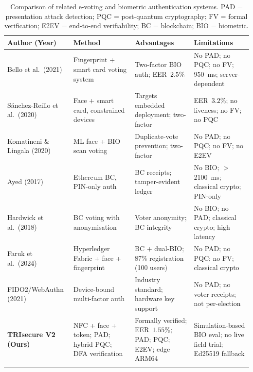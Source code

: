 \documentclass[pdflatex,sn-mathphys-num]{sn-jnl}%
\theoremstyle{thmstyleone}%
\theoremstyle{thmstyletwo}%
\theoremstyle{thmstylethree}%
\begin{document}
\begin{table}[t]
\caption{Comparison of related e-voting and biometric authentication systems.
  PAD = presentation attack detection; PQC = post-quantum cryptography;
  FV = formal verification; E2EV = end-to-end verifiability;
  BC = blockchain; BIO = biometric.}
\label{tab:related_comparison}%
\begin{tabular*}{\textwidth}{@{\extracolsep\fill}p{2.1cm}p{2.7cm}p{3.0cm}p{3.0cm}}
  \toprule
  \textbf{Author (Year)} & \textbf{Method} & \textbf{Advantages} & \textbf{Limitations} \\
  \midrule
  Bello et al.\ (2021)~\cite{bello2021biometric}
    & Fingerprint + smart card voting system
    & Two-factor BIO auth; EER~$2.5\%$
    & No PAD; no PQC; no FV; 950~ms; server-dependent \\
  \addlinespace
  S\'{a}nchez-Reillo et al.\ (2020)~\cite{sanchez2020biometric}
    & Face + smart card, constrained devices
    & Targets embedded deployment; two-factor
    & EER~$3.2\%$; no liveness; no FV; no PQC \\
  \addlinespace
  Komatineni \& Lingala (2020)~\cite{komatineni2020biometric}
    & ML face + BIO scan voting
    & Duplicate-vote prevention; two-factor
    & No PAD; no PQC; no FV; no E2EV \\
  \addlinespace
  Ayed (2017)~\cite{ayed2017conceptual}
    & Ethereum BC, PIN-only auth
    & BC receipts; tamper-evident ledger
    & No BIO; $>$2100~ms; classical crypto; PIN-only \\
  \addlinespace
  Hardwick et al.\ (2018)~\cite{hardwick2018voting}
    & BC voting with anonymisation
    & Voter anonymity; BC integrity
    & No BIO; no PAD; classical crypto; high latency \\
  \addlinespace
  Faruk et al.\ (2024)~\cite{faruk2024transforming}
    & Hyperledger Fabric + face + fingerprint
    & BC + dual-BIO; 87\% registration (100 users)
    & No PAD; no PQC; no FV; classical crypto \\
  \addlinespace
  FIDO2/WebAuthn (2021)~\cite{fido2_webauthn}
    & Device-bound multi-factor auth
    & Industry standard; hardware key support
    & No PAD; no voter receipts; not per-election \\
  \addlinespace
  \textbf{TRIsecure V2 (Ours)}
    & NFC + face + token; PAD; hybrid PQC; DFA verification
    & Formally verified; EER~$1.55\%$; PAD; PQC; E2EV; edge ARM64
    & Simulation-based BIO eval; no live field trial; Ed25519 fallback \\
  \botrule
\end{tabular*}
\end{table}
\end{document}
